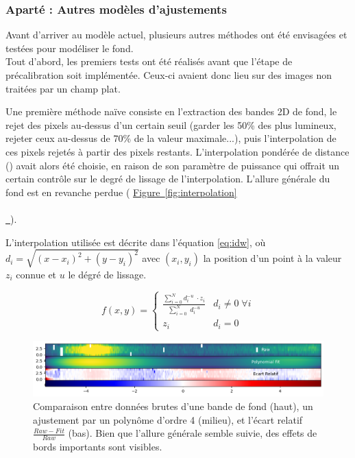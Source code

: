 \documentclass[12pt, a4paper]{article}
\newcommand*{\figref}[2][]{%
  \hyperref[{#2}]{%
    Figure~\ref*{#2}%
    \ifx\\#1\\%
    \else
      \,#1%
    \fi
  }%
}
\begin{document}
\subsubsection{Aparté : Autres modèles d'ajustements}

Avant d'arriver au modèle actuel, plusieurs autres méthodes ont été envisagées et testées pour modéliser le fond.\\

Tout d'abord, les premiers tests ont été réalisés avant que l'étape de précalibration soit implémentée. Ceux-ci avaient donc lieu sur des images non traitées par un champ plat.

Une première méthode naïve consiste en l'extraction des bandes 2D de fond, le rejet des pixels au-dessus d'un certain seuil (garder les 50\% des plus lumineux, rejeter ceux au-dessus de 70\% de la valeur maximale...), puis l'interpolation de ces pixels rejetés à partir des pixels restants. L'interpolation pondérée de distance (\parencite{10.1145/800186.810616}) avait alors été choisie, en raison de son paramètre de puissance qui offrait un certain contrôle sur le degré de lissage de l'interpolation. L'allure générale du fond est en revanche perdue (\figref{fig:interpolation}).

L'interpolation utilisée est décrite dans l'équation \ref{eq:idw}, où $d_i = \sqrt{(x-x_i)^2 + (y-y_i)^2}$ avec $(x_i,y_i)$ la position d'un point à la valeur $z_i$ connue et $u$ le dégré de lissage.

\begin{equation}
  \label{eq:idw}
  f(x,y) = 
  \begin{cases}
    \frac{\sum_{i=0}^{N} d_i^{-u} \; \cdot z_i}{\sum_{i=0}^N \;d_i^{-u}} & d_i \neq 0 \; \forall i\\
    z_i & d_i = 0

  \end{cases}
\end{equation}

\begin{figure}[H]
  \centering
  \includegraphics[scale=0.72]{assets/2D_polynomial.png}
  \caption{Comparaison entre données brutes d'une bande de fond (haut), un ajustement par un polynôme d'ordre 4 (milieu), et l'écart relatif $\frac{Raw - Fit}{Raw}$ (bas). Bien que l'allure générale semble suivie, des effets de bords importants sont visibles.}
  \label{fig:2D_polynomial}
\end{figure}
\end{document}
